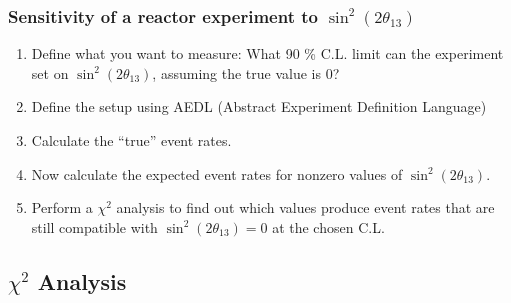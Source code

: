 \documentclass{beamer}
\begin{document}
\begin{frame}
  \frametitle{Sensitivity of a reactor experiment to $\sin^2 (2 \theta_{13})$}

  \begin{enumerate}
    \item Define what you want to measure: What 90 \% C.L. limit can the experiment set on
          $\sin^2 (2 \theta_{13})$, assuming the true value is 0?
    \item Define the setup using AEDL (Abstract Experiment Definition Language)
    \item Calculate the ``true'' event rates.
    \item Now calculate the expected event rates for nonzero values of $\sin^2 (2 \theta_{13})$.
    \item Perform a $\chi^2$ analysis to find out which values produce event rates that
          are still compatible with $\sin^2 (2 \theta_{13}) = 0$ at the chosen C.L.
  \end{enumerate}
\end{frame}


\subsection{$\chi^2$ Analysis}
\end{document}
